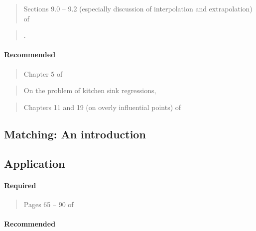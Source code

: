 \documentclass[12pt]{article}
\newcommand{\bibverse}[1]{\begin{verse} \bibentry{#1}. \end{verse}}
\begin{document}
\begin{verse} Sections 9.0 -- 9.2 (especially discussion of interpolation and extrapolation) of  \end{verse}

\bibverse{berk2010}

\paragraph*{Recommended}

\begin{verse} Chapter 5 of  \end{verse}

\begin{verse}  \end{verse}

\begin{verse} On the problem of kitchen sink regressions,  \end{verse}

\begin{verse} Chapters 11 and 19 (on overly influential points) of  \end{verse}

\subsection{Matching: An introduction}

\subsection*{Application}

\begin{verse}  \end{verse}

\paragraph*{Required}

\begin{verse}
  Pages 65 -- 90 of 
\end{verse}

\paragraph*{Recommended}
\end{document}

